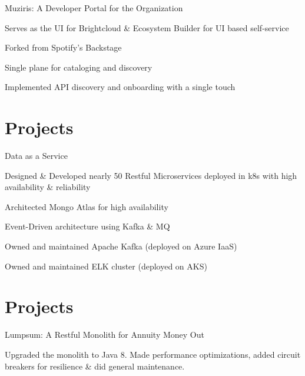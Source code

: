 \documentclass[]{de-resume}
\begin{document}
\begin{minipage}[t]{0.66\textwidth}
\begin{tightemize}
 \item Muziris: A Developer Portal for the Organization
 \begin{tightemize}
 	\sectionsep
 	\item Serves as the UI for Brightcloud \& Ecosystem Builder for UI based self-service
 	\item Forked from Spotify's Backstage
 	\item Single plane for cataloging and discovery 
 	\item Implemented API discovery and onboarding with a single touch
 	\sectionsep
 \end{tightemize}
\section{Projects}
  
\end{tightemize}
\sectionsep
{}
\begin{tightemize}
 \item Data as a Service
 	\sectionsep
 	\begin{tightemize}
 	\item Designed \& Developed nearly 50 Restful Microservices deployed in k8s with high availability \& reliability
 	\item Architected Mongo Atlas for high availability 
 	\item Event-Driven architecture using Kafka \& MQ
 	\item Owned and maintained Apache Kafka (deployed on Azure IaaS)
 	\item Owned and maintained ELK cluster (deployed on AKS)
 	\end{tightemize}
 	\sectionsep
 \end{tightemize}
\section{Projects}
  
\subsectionsep
\subsectionsep
 \subsectionsep
 \begin{tightemize}
 \item Lumpsum: A Restful Monolith for Annuity Money Out
 	\begin{tightemize}
 		\sectionsep
 		\item Upgraded the monolith to Java 8. Made performance optimizations, added circuit breakers for resilience \& did general maintenance.
 		\sectionsep
 	\end{tightemize}
 \end{tightemize}


\end{minipage}
\end{document}
